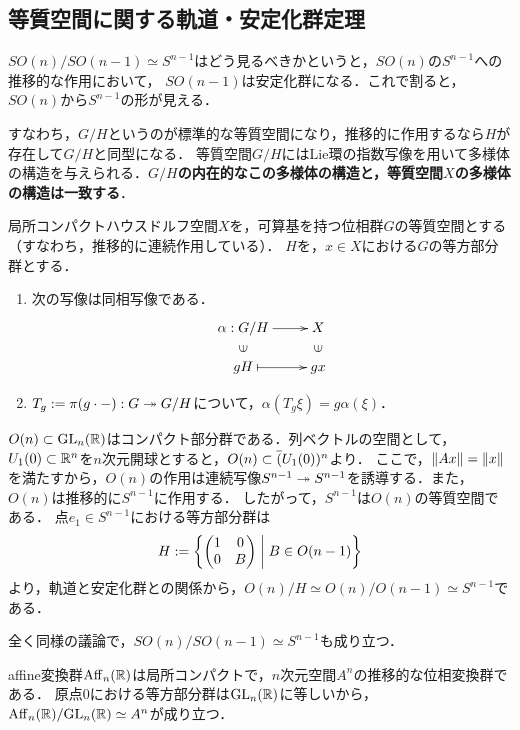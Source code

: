 \documentclass[uplatex,dvipdfmx]{jsreport}
\begin{document}
\subsection{等質空間に関する軌道・安定化群定理}

\begin{tcolorbox}[colframe=ForestGreen, colback=ForestGreen!10!white,breakable,colbacktitle=ForestGreen!40!white,coltitle=black,fonttitle=\bfseries\sffamily,
title=]
    $SO(n)/SO(n-1)\simeq S^{n-1}$はどう見るべきかというと，$SO(n)$の$S^{n-1}$への推移的な作用において，
    $SO(n-1)$は安定化群になる．これで割ると，$SO(n)$から$S^{n-1}$の形が見える．

    すなわち，$G/H$というのが標準的な等質空間になり，推移的に作用するなら$H$が存在して$G/H$と同型になる．
    等質空間$G/H$にはLie環の指数写像を用いて多様体の構造を与えられる．\textbf{$G/H$の内在的なこの多様体の構造と，等質空間$X$の多様体の構造は一致する}．
\end{tcolorbox}

\begin{theorem}
    局所コンパクトハウスドルフ空間$X$を，可算基を持つ位相群$G$の等質空間とする（すなわち，推移的に連続作用している）．
    $H$を，$x\in X$における$G$の等方部分群とする．
    \begin{enumerate}
        \item 次の写像は同相写像である．
        \[\xymatrix@R-2pc{
            \alpha:G/H\ar[r]&X\\
            \rotatebox[origin=c]{90}{$\in$}&\rotatebox[origin=c]{90}{$\in$}\\
            gH\ar@{|->}[r]&gx
        }\]
        \item $T_g:=\pi(g\cdot -):G\twoheadrightarrow G/H$について，$\alpha(T_g\xi)=g\alpha(\xi)$．
    \end{enumerate}
\end{theorem}
\begin{example}[直交群の等質空間としての単位球面]
    $O(n)\subset\mathrm{GL}_n(\mathbb{R})$はコンパクト部分群である．列ベクトルの空間として，$U_1(0)\subset\mathbb{R}^n$を$n$次元開球とすると，$O(n)\subset\overline{(}U_1(0))^n$より．
    ここで，$\|Ax\|=\|x\|$を満たすから，$O(n)$の作用は連続写像$S^{n-1}\twoheadrightarrow S^{n-1}$を誘導する．また，$O(n)$は推移的に$S^{n-1}$に作用する．
    したがって，$S^{n-1}$は$O(n)$の等質空間である．
    点$e_1\in S^{n-1}$における等方部分群は
    \[H:=\left\{\begin{pmatrix}1&0\\0&B\end{pmatrix}\;\middle|\;B\in O(n-1)\right\}\]
    より，軌道と安定化群との関係から，$O(n)/H\simeq O(n)/O(n-1)\simeq S^{n-1}$である．

    全く同様の議論で，$SO(n)/SO(n-1)\simeq S^{n-1}$も成り立つ．
\end{example}
\begin{example}[affine空間]
    affine変換群$\mathrm{Aff}_n(\mathbb{R})$は局所コンパクトで，$n$次元空間$A^n$の推移的な位相変換群である．
    原点$0$における等方部分群は$\mathrm{GL}_n(\mathbb{R})$に等しいから，$\mathrm{Aff}_n(\mathbb{R})/\mathrm{GL}_n(\mathbb{R})\simeq A^n$が成り立つ．
\end{example}
\end{document}
